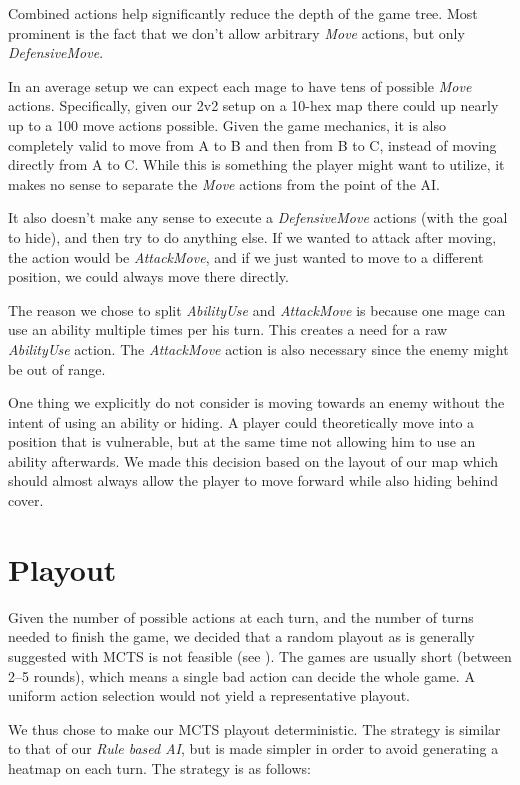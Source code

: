 Combined actions help significantly reduce the depth of the game tree. Most
prominent is the fact that we don't allow arbitrary \emph{Move} actions, but
only \emph{DefensiveMove}.

In an average setup we can expect each mage to have tens of possible
\emph{Move} actions. Specifically, given our 2v2 setup on a 10-hex map there
could up nearly up to a 100 move actions possible. Given the game mechanics, it
is also completely valid to move from A to B and then from B to C, instead of
moving directly from A to C. While this is something the player might want to
utilize, it makes no sense to separate the \emph{Move} actions from the point
of the AI\@.

It also doesn't make any sense to execute a \emph{DefensiveMove} actions (with
the goal to hide), and then try to do anything else. If we wanted to attack
after moving, the action would be \emph{AttackMove}, and if we just wanted to
move to a different position, we could always move there directly.

The reason we chose to split \emph{AbilityUse} and \emph{AttackMove} is because one
mage can use an ability multiple times per his turn. This creates a need for a raw
\emph{AbilityUse} action. The \emph{AttackMove} action is also necessary since the enemy
might be out of range.

One thing we explicitly do not consider is moving towards an enemy without the intent
of using an ability or hiding. A player could theoretically move into a position
that is vulnerable, but at the same time not allowing him to use an ability afterwards.
We made this decision based on the layout of our map  which should
almost always allow the player to move forward while also hiding behind cover.

\section{Playout}

Given the number of possible actions at each turn, and the number of turns
needed to finish the game, we decided that a random playout as is generally
suggested with MCTS is not feasible (see \citet{mcts-survey}). The games
are usually short (between 2--5 rounds), which means a single bad action can decide
the whole game. A uniform action selection would not yield a representative playout.

We thus chose to make our MCTS playout deterministic. The strategy
is similar to that of our \emph{Rule based AI}, but is made simpler in order
to avoid generating a heatmap on each turn. The strategy is as follows:

